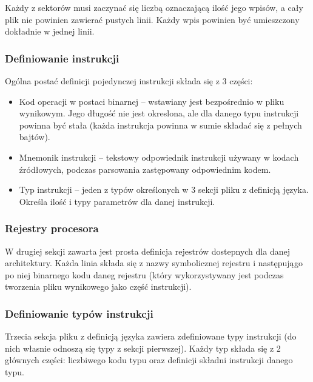\documentclass[a4paper,12pt]{report}
\begin{document}
Każdy z sektorów musi zaczynać się liczbą oznaczającą ilość jego wpisów, a cały plik nie powinien zawierać pustych linii. Każdy wpis powinien być umieszczony dokładnie w jednej linii.

\subsubsection{Definiowanie instrukcji}
Ogólna postać definicji pojedynczej instrukcji składa się z 3 części:
\begin{itemize}
  \item Kod operacji w postaci binarnej -- wstawiany jest bezpośrednio w pliku wynikowym. Jego długość nie jest okreslona, ale dla danego typu instrukcji powinna być stała (każda instrukcja powinna w sumie składać się z pełnych bajtów).
  \item Mnemonik instrukcji -- tekstowy odpowiednik instrukcji używany w kodach źródłowych, podczas parsowania zastępowany odpowiednim kodem.
  \item Typ instrukcji -- jeden z typów określonych w 3 sekcji pliku z definicją języka. Określa ilość i typy parametrów dla danej instrukcji.
\end{itemize}

\subsubsection{Rejestry procesora}

W drugiej sekcji zawarta jest prosta definicja rejestrów dostepnych dla danej architektury. Każda linia składa się z nazwy symbolicznej rejestru i następujągo po niej binarnego kodu daneg rejestru (który wykorzystywany jest podczas tworzenia pliku wynikowego jako część instrukcji).

\subsubsection{Definiowanie typów instrukcji}

Trzecia sekcja pliku z definicją języka zawiera zdefiniowane typy instrukcji (do nich własnie odnoszą się typy z sekcji pierwszej). Każdy typ składa się z 2 głównych części: liczbiwego kodu typu oraz definicji składni instrukcji danego typu.
\end{document}
